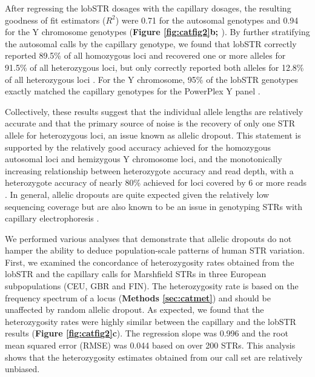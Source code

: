 After regressing the lobSTR dosages with the capillary dosages, the resulting goodness of fit estimators ($R^2$) were 0.71 for the autosomal genotypes and 0.94 for the Y chromosome genotypes (\textbf{Figure \ref{fig:catfig2}b; \cite{SuppWillemsGymrekHighnamEtAl2014}}). By further stratifying the autosomal calls by the capillary genotype, we found that lobSTR correctly reported 89.5\% of all homozygous loci and recovered one or more alleles for 91.5\% of all heterozygous loci, but only correctly reported both alleles for 12.8\% of all heterozygous loci \cite{SuppWillemsGymrekHighnamEtAl2014}. For the Y chromosome, 95\% of the lobSTR genotypes exactly matched the capillary genotypes for the PowerPlex Y panel \cite{SuppWillemsGymrekHighnamEtAl2014}. 

Collectively, these results suggest that the individual allele lengths are relatively accurate and that the primary source of noise is the recovery of only one STR allele for heterozygous loci, an issue known as allelic dropout. This statement is supported by the relatively good accuracy achieved for the homozygous autosomal loci and hemizygous Y chromosome loci, and the monotonically increasing relationship between heterozygote accuracy and read depth, with a heterozygote accuracy of nearly 80\% achieved for loci covered by 6 or more reads \cite{SuppWillemsGymrekHighnamEtAl2014}. In general, allelic dropouts are quite expected given the relatively low sequencing coverage but are also known to be an issue in genotyping STRs with capillary electrophoresis \cite{PompanonBoninBellemainEtAl2005}.   

We performed various analyses that demonstrate that allelic dropouts do not hamper the ability to deduce population-scale patterns of human STR variation. First, we examined the concordance of heterozygosity rates obtained from the lobSTR and the capillary calls for Marshfield STRs in three European subpopulations (CEU, GBR and FIN). The heterozygosity rate is based on the frequency spectrum of a locus (\textbf{Methods \ref{sec:catmet}}) and should be unaffected by random allelic dropout. As expected, we found that the heterozygosity rates were highly similar between the capillary and the lobSTR results (\textbf{Figure \ref{fig:catfig2}c}). The regression slope was 0.996 and the root mean squared error (RMSE) was 0.044 based on over 200 STRs. This analysis shows that the heterozygosity estimates obtained from our call set are relatively unbiased. 

